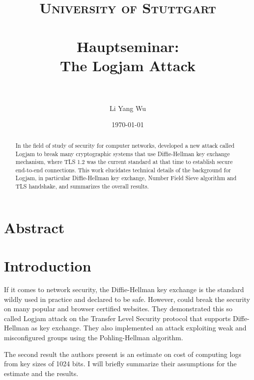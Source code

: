 \documentclass[paper=a4, fontsize=11pt]{scrartcl} %
\title{	
\normalfont \normalsize 
\textsc{University of Stuttgart} \\ [25pt] %
\horrule{0.5pt} \\[0.4cm] %
\huge Hauptseminar:\\The Logjam Attack \\ %
\horrule{2pt} \\[0.5cm] %
}
\author{Li Yang Wu} %
\date{\normalsize\today} %
\numberwithin{equation}{section} %
\numberwithin{figure}{section} %
\numberwithin{table}{section} %
\begin{document}
\maketitle %

\tableofcontents

\newpage

\section*{Abstract}
\begin{abstract}
In the field of study of security for computer networks, \citep{Adrian:2015:IFS:2810103.2813707} developed a new attack called Logjam to break many cryptographic systems that use Diffie-Hellman key exchange mechanism, where TLS 1.2 was the current standard at that time to establish secure end-to-end connections. This work elucidates technical details of the background for Logjam, in particular Diffie-Hellman key exchange, Number Field Sieve algorithm and TLS handshake, and summarizes the overall results.
\end{abstract}
\section{Introduction}
If it comes to network security, the Diffie-Hellman key exchange is the standard wildly used in practice and declared to be safe. However, \citep{Adrian:2015:IFS:2810103.2813707} could break the security on many popular and browser certified websites. They demonstrated this so called Logjam attack on the Transfer Level Security protocol that supports Diffe-Hellman as key exchange. They also implemented an attack exploiting weak and misconfigured groups using the Pohling-Hellman algorithm.

The second result the authors present is an estimate on cost of computing logs from key sizes of 1024 bits. I will briefly summarize their assumptions for the estimate and the results.
\end{document}
